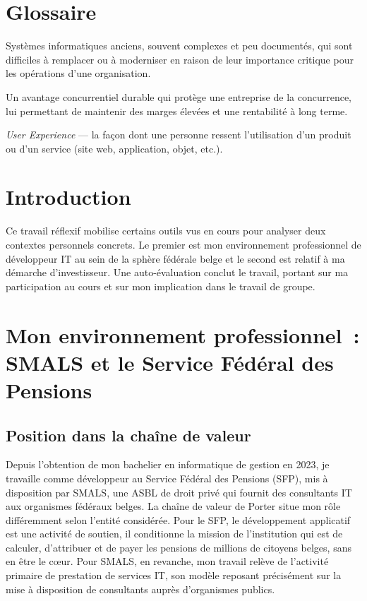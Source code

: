 \documentclass[12pt, a4paper]{article}
\begin{document}
\pagestyle{empty}


\newpage
\tableofcontents

\newpage
\setcounter{page}{1}
\pagestyle{fancy}
\section*{Glossaire}

\begin{description}[leftmargin=4.5cm, style=sameline, font=\normalfont\bfseries]
  \item[Legacy] Systèmes informatiques anciens, souvent complexes et peu documentés, qui sont difficiles à remplacer ou à moderniser en raison de leur importance critique pour les opérations d'une organisation.
  \item[Moat] Un avantage concurrentiel durable qui protège une entreprise de la concurrence, lui permettant de maintenir des marges élevées et une rentabilité à long terme.
  \item[UX] \textit{User Experience} — la façon dont une personne ressent l'utilisation d'un produit ou d'un service (site web, application, objet, etc.).
\end{description}

\newpage
\section{Introduction}

Ce travail réflexif mobilise certains outils vus en cours 
pour analyser deux contextes personnels concrets. Le premier est mon 
environnement professionnel de développeur IT au sein de 
la sphère fédérale belge et le second est relatif à
ma démarche d'investisseur. 
Une auto-évaluation 
conclut le travail, portant sur ma participation au cours 
et sur mon implication dans le travail de groupe.

\section{Mon environnement professionnel~: SMALS et le Service Fédéral des Pensions}

\subsection{Position dans la chaîne de valeur}

Depuis l'obtention de mon bachelier en informatique de 
gestion en 2023, je travaille comme développeur au Service 
Fédéral des Pensions (SFP), mis à disposition par SMALS, 
une ASBL de droit privé qui fournit des consultants IT aux organismes 
fédéraux belges. La chaîne de valeur de Porter situe mon 
rôle différemment selon l'entité considérée. Pour le SFP, 
le développement applicatif est une activité de soutien, 
il conditionne la mission de l'institution qui est de
calculer, d'attribuer et de payer les pensions
de millions de citoyens belges, sans 
en être le cœur. Pour SMALS, en revanche, mon travail relève 
de l'activité primaire de prestation de services IT, son 
modèle reposant précisément sur la mise à disposition de 
consultants auprès d'organismes publics.
\end{document}
